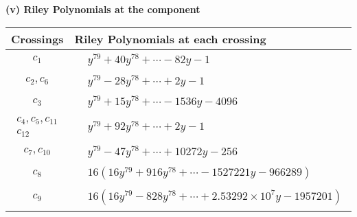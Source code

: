 \documentclass[1p]{elsarticle_modified}
\theoremstyle{definition}
\begin{document}
\newpage\renewcommand{\arraystretch}{1}
\flushleft \textbf{(v) Riley Polynomials at the component}\newline \\
\begin{tabular}{m{50pt}|m{274pt}}
Crossings & \hspace{64pt}Riley Polynomials at each crossing \\
\hline $$\begin{aligned}c_{1}\end{aligned}$$&$\begin{aligned}
&y^{79}+40 y^{78}+\cdots-82 y-1
\end{aligned}$\\
\hline $$\begin{aligned}c_{2},c_{6}\end{aligned}$$&$\begin{aligned}
&y^{79}-28 y^{78}+\cdots+2 y-1
\end{aligned}$\\
\hline $$\begin{aligned}c_{3}\end{aligned}$$&$\begin{aligned}
&y^{79}+15 y^{78}+\cdots-1536 y-4096
\end{aligned}$\\
\hline $$\begin{aligned}c_{4},c_{5},c_{11}\\c_{12}\end{aligned}$$&$\begin{aligned}
&y^{79}+92 y^{78}+\cdots+2 y-1
\end{aligned}$\\
\hline $$\begin{aligned}c_{7},c_{10}\end{aligned}$$&$\begin{aligned}
&y^{79}-47 y^{78}+\cdots+10272 y-256
\end{aligned}$\\
\hline $$\begin{aligned}c_{8}\end{aligned}$$&$\begin{aligned}
&16(16 y^{79}+916 y^{78}+\cdots-1527221 y-966289)
\end{aligned}$\\
\hline $$\begin{aligned}c_{9}\end{aligned}$$&$\begin{aligned}
&16(16 y^{79}-828 y^{78}+\cdots+2.53292\times10^{7} y-1957201)
\end{aligned}$\\
\hline
\end{tabular}\\~\\
\end{document}

